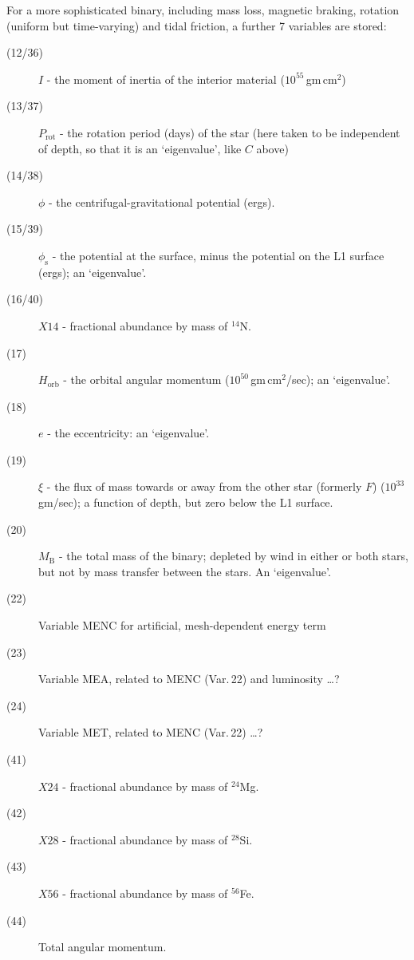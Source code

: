 For a more sophisticated binary, including mass loss, magnetic braking, 
rotation (uniform but time-varying) and tidal friction, a further 7 variables 
are stored:
\begin{description}
\item[(12/36)] $I$ - the moment of inertia of the interior material 
($10^{55}\,$gm\,cm$^2$)
\item[(13/37)] $P_\mathrm{rot}$ - the rotation period (days) of the star (here taken 
to be independent of depth, so that it is an `eigenvalue', like $C$ above)
\item[(14/38)] $\phi$ - the centrifugal-gravitational potential (ergs). 
\item[(15/39)] $\phi_\mathrm{s}$ - the potential at the surface, minus the
potential on the L1 surface (ergs); an `eigenvalue'.
\item[(16/40)] $X14$ - fractional abundance by mass of $^{14}$N.


\item[(17)] $H_\mathrm{orb}$ - the orbital angular momentum 
($10^{50}\,$gm\,cm$^2$/sec); an `eigenvalue'.
\item[(18)] $e$ - the eccentricity:  an `eigenvalue'.
\item[(19)] $\xi$ - the flux of mass towards or away from the other star (formerly $F$)
($10^{33}\,$gm/sec);
a function of depth, but zero below the L1 surface.
\item[(20)] $M_\mathrm{B}$ - the total mass of the binary; depleted by wind in either or both stars, but not by mass transfer between the stars. An `eigenvalue'.
\item[(22)] Variable MENC for artificial, mesh-dependent energy term
\item[(23)] Variable MEA, related to MENC (Var.\,22) and luminosity \ldots?
\item[(24)] Variable MET, related to MENC (Var.\,22) \ldots?

\item[(41)] $X24$ - fractional abundance by mass of $^{24}$Mg.
\item[(42)] $X28$ - fractional abundance by mass of $^{28}$Si.
\item[(43)] $X56$ - fractional abundance by mass of $^{56}$Fe.

\item[(44)] Total angular momentum.
\end{description}

